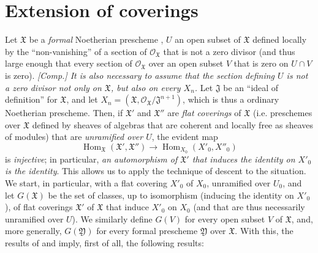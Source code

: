 \documentclass{article}
\theoremstyle{plain}
\theoremstyle{definition}
\newcommand{\sh}[1]{{\mathscr{#1}}}
\newcommand{\fk}[1]{{\mathfrak{#1}}}
\DeclareMathOperator{\Hom}{Hom}
\newcommand{\oldpage}[1]{\marginpar{\footnotesize$\Big\vert$ \textit{p.~#1}}}
\begin{document}
\section{Extension of coverings}
\label{C.5}

Let $\fk{X}$ be a \emph{formal} Noetherian prescheme \cite{2}, $U$ an open subset of $\fk{X}$ defined locally by the ``non-vanishing'' of a section of $\sh{O}_\fk{X}$ that is not a zero divisor (and thus large enough that every section of $\sh{O}_\fk{X}$ over an open subset $V$ that is zero on $U\cap V$ is zero).
\emph{[Comp.] It is also necessary to assume that the section defining $U$ is not a zero divisor not only on $\fk{X}$, but also on every $X_n$.}
Let $\fk{J}$ be an ``ideal of definition'' for $\fk{X}$, and let $X_n=(\fk{X},\sh{O}_\fk{X}/\fk{J}^{n+1})$, which is thus a ordinary Noetherian prescheme.
Then, if $\fk{X}'$ and $\fk{X}''$ are \emph{flat coverings} of $\fk{X}$ (i.e. preschemes over $\fk{X}$ defined by sheaves of algebras that are coherent and locally free as sheaves of modules) that are \emph{unramified over $U$}, the evident map
\[
  \Hom_\fk{X}(\fk{X}',\fk{X}'') \to \Hom_{X_0}(X'_0,X''_0)
\]
is \emph{injective};
in particular, \emph{an automorphism of $\fk{X}'$ that induces the identity on $X'_0$ is the identity}.
This allows us to apply the technique of descent to the situation.
We start, in particular, with a flat covering $X'_0$ of $X_0$, unramified
\oldpage{195-20}
over $U_0$, and let $G(\fk{X})$ be the set of classes, up to isomorphism (inducing the identity on $X'_0$), of flat coverings $\fk{X}'$ of $\fk{X}$ that induce $X'_0$ on $X_0$ (and that are thus necessarily unramified over $U$).
We similarly define $G(V)$ for every open subset $V$ of $\fk{X}$, and, more generally, $G(\fk{Y})$ for every formal prescheme $\fk{Y}$ over $\fk{X}$.
With this, the results of \cite{2} and \cite{3} imply, first of all, the following results:
\end{document}
